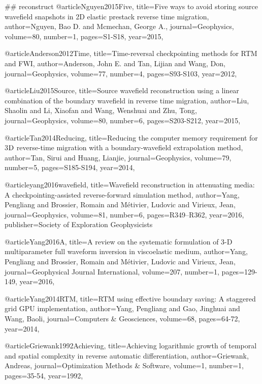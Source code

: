 {## reconstruct
@article{Nguyen2015Five,
  title={Five ways to avoid storing source wavefield snapshots in 2D elastic prestack reverse time migration},
  author={Nguyen, Bao D. and Mcmechan, George A.},
  journal={Geophysics},
  volume={80},
  number={1},
  pages={S1-S18},
  year={2015},
}

@article{Anderson2012Time,
  title={Time-reversal checkpointing methods for {RTM} and {FWI}},
  author={Anderson, John E. and Tan, Lijian and Wang, Don},
  journal={Geophysics},
  volume={77},
  number={4},
  pages={S93-S103},
  year={2012},
}

@article{Liu2015Source,
  title={Source wavefield reconstruction using a linear combination of the boundary wavefield in reverse time migration},
  author={Liu, Shaolin and Li, Xiaofan and Wang, Wenshuai and Zhu, Tong},
  journal={Geophysics},
  volume={80},
  number={6},
  pages={S203-S212},
  year={2015},
}

@article{Tan2014Reducing,
  title={Reducing the computer memory requirement for 3$\textnormal{D}$ reverse-time migration with a boundary-wavefield extrapolation method},
  author={Tan, Sirui and Huang, Lianjie},
  journal={Geophysics},
  volume={79},
  number={5},
  pages={S185-S194},
  year={2014},
}

@article{yang2016wavefield,
  title={Wavefield reconstruction in attenuating media: A checkpointing-assisted reverse-forward simulation method},
  author={Yang, Pengliang and Brossier, Romain and M{\'e}tivier, Ludovic and Virieux, Jean},
  journal={Geophysics},
  volume={81},
  number={6},
  pages={R349--R362},
  year={2016},
  publisher={Society of Exploration Geophysicists}
}

@article{Yang2016A,
  title={A review on the systematic formulation of 3-{D} multiparameter full waveform inversion in viscoelastic medium},
  author={Yang, Pengliang and Brossier, Romain and Métivier, Ludovic and Virieux, Jean},
  journal={Geophysical Journal International},
  volume={207},
  number={1},
  pages={129-149},
  year={2016},
}

@article{Yang2014RTM,
  title={{RTM} using effective boundary saving: A staggered grid GPU implementation},
  author={Yang, Pengliang and Gao, Jinghuai and Wang, Baoli},
  journal={Computers \& Geosciences},
  volume={68},
  pages={64-72},
  year={2014},
}


@article{Griewank1992Achieving,
  title={Achieving logarithmic growth of temporal and spatial complexity in reverse automatic differentiation},
  author={Griewank, Andreas},
  journal={Optimization Methods \& Software},
  volume={1},
  number={1},
  pages={35-54},
  year={1992},
}

}
